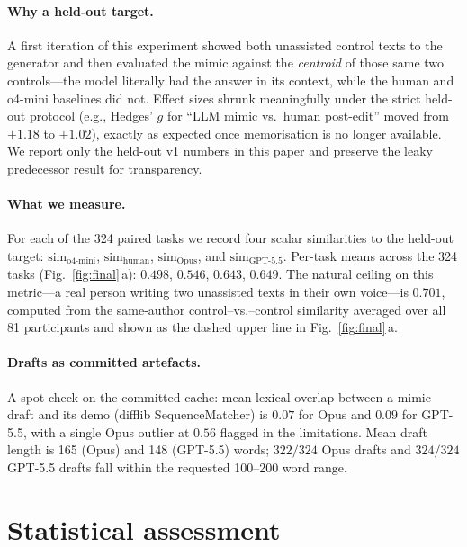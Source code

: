\documentclass[runningheads]{llncs}
\begin{document}
\paragraph{Why a held-out target.}
A first iteration of this experiment showed both unassisted control
texts to the generator and then evaluated the mimic against the
\emph{centroid} of those same two controls---the model literally had
the answer in its context, while the human and o4-mini baselines did
not. Effect sizes shrunk meaningfully under the strict held-out
protocol (e.g., Hedges' $g$ for ``LLM mimic vs.\ human post-edit''
moved from $+1.18$ to $+1.02$), exactly as expected once memorisation
is no longer available. We report only the held-out v1 numbers in
this paper and preserve the leaky predecessor result for
transparency.

\paragraph{What we measure.}
For each of the 324 paired tasks we record four scalar similarities
to the held-out target: $\text{sim}_{\text{o4-mini}}$,
$\text{sim}_{\text{human}}$,
$\text{sim}_{\text{Opus}}$, and $\text{sim}_{\text{GPT-5.5}}$.
Per-task means across the 324 tasks (Fig.~\ref{fig:final}\,a):
$0.498$, $0.546$, $0.643$, $0.649$. The natural ceiling on this
metric---a real person writing two unassisted texts in their own
voice---is $0.701$, computed from the same-author control--vs.--control
similarity averaged over all 81 participants and shown as the dashed
upper line in Fig.~\ref{fig:final}\,a.

\paragraph{Drafts as committed artefacts.}
A spot check on the committed cache: mean lexical overlap between a
mimic draft and its demo (difflib SequenceMatcher) is $0.07$ for
Opus and $0.09$ for GPT-5.5, with a single Opus outlier at $0.56$
flagged in the limitations. Mean draft length is 165 (Opus) and 148
(GPT-5.5) words; $322{/}324$ Opus drafts and $324{/}324$ GPT-5.5
drafts fall within the requested 100--200 word range.

\section{Statistical assessment}\label{sec:stats}
\end{document}
